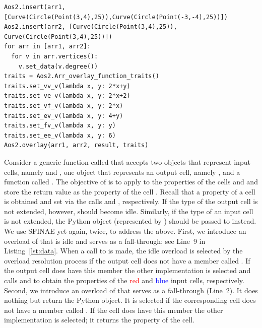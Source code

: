 \begin{lstfloat}
  \begin{lstlisting}[style=pythonFramedStyle,basicstyle=\normalsize,
                     label={lst::overlayCircleSegment},
                     caption={Constructing two arrangements with their vertices extended and computing their map overlay using the overlay function traits.}]
Aos2.insert(arr1,[Curve(Circle(Point(3,4),25)),Curve(Circle(Point(-3,-4),25))])
Aos2.insert(arr2, [Curve(Circle(Point(3,4),25)), Curve(Circle(Point(3,4),25))])
for arr in [arr1, arr2]:
  for v in arr.vertices():
    v.set_data(v.degree())
traits = Aos2.Arr_overlay_function_traits()
traits.set_vv_v(lambda x, y: 2*x+y)
traits.set_ve_v(lambda x, y: 2*x+2)
traits.set_vf_v(lambda x, y: 2*x)
traits.set_ev_v(lambda x, y: 4+y)
traits.set_fv_v(lambda x, y: y)
traits.set_ee_v(lambda x, y: 6)
Aos2.overlay(arr1, arr2, result, traits)
  \end{lstlisting}
\end{lstfloat}

Consider a generic function called  that accepts
two objects that represent input cells, namely  and
, one object that represents an output cell, namely
, and a function called . The
objective of  is to apply  to
the properties of the cells  and  and
store the return value as the property of the cell
. Recall that a property of a cell  is
obtained and set via the calls  and
, respectively. If the type of the output
cell is not extended, however,  should become
idle. Similarly, if the type of an input cell is not extended, the
 Python object (represented by
) should be passed to 
instead. We use SFINAE yet again, twice, to address the above. First,
we introduce an overload of  that is idle and
serves as a fall-through; see Line~9 in Listing~\ref{lst:data}. When a
call to  is made, the idle overload is selected
by the overload resolution process if the output cell does not have a
member called . If the output cell does have
this member the other implementation is selected and calls
 and  to obtain the
properties of the \textcolor{red}{red} and \textcolor{blue}{blue}
input cells, respectively. Second, we introduce an overload of
 that serves as a fall-through (Line~2). It does
nothing but return the  Python object. It is
selected if the corresponding cell does not have a member called
. If the cell does have this member the other
implementation is selected; it returns the property of the cell.

